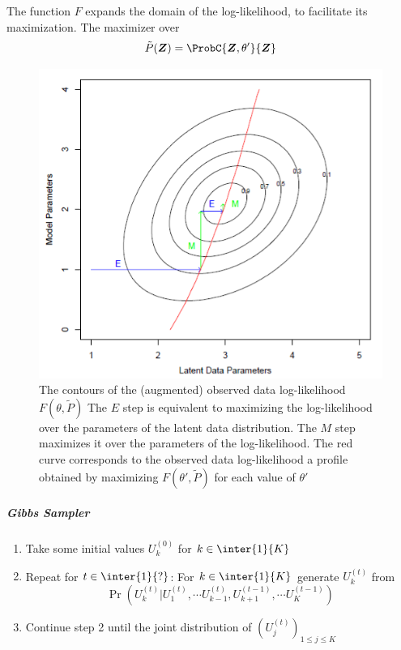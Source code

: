 The  function $F$ expands the domain of the log-likelihood, to facilitate its maximization.
The maximizer over $$\tilde{P}(\bm{Z})=\ProbC{\bm{Z},\theta'}{\bm{Z}}$$
\begin{figure}[H]
	\begin{center}
		\includegraphics[width=.5\textwidth]{./chap/1chap/6sec/images/3_emAlgo.PNG}
	\end{center}
	\caption{The contours of the (augmented) observed data log-likelihood $F(\theta,\tilde{P})$
	The $E$ step is equivalent to maximizing the log-likelihood over the parameters of the 
	latent data distribution. The $M$ step maximizes it over the parameters of the 
	log-likelihood. The red curve corresponds to the observed data log-likelihood a profile
	obtained by maximizing $F(\theta', \tilde{P})$ for each value of $\theta'$}
	\label{fig:3_emAlgo}
\end{figure}
\subparagraph{Gibbs Sampler}
\begin{enumerate}
	\item Take some initial values $U_{k}^{(0)}$ for $k\in\inter{1}{K}$
	\item Repeat for $t\in\inter{1}{?}$:
		For $k\in\inter{1}{K}$ generate $U_{k}^{(t)}$ from 
		$$ \Pr(U_{k}^{(t)}|U_{1}^{(t)}, \cdots U_{k-1}^{(t)}, U_{k+1}^{(t-1)},\cdots U_{K}^{(t-1)})$$
	\item Continue step 2 until the joint distribution of $\left( U_{j}^{(t)} \right)_{1\leq j\leq K}$
\end{enumerate}
